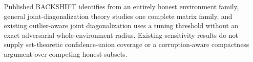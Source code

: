 Published BACKSHIFT identifies from an entirely honest environment family, general joint-diagonalization theory studies one complete matrix family, and existing outlier-aware joint diagonalization uses a tuning threshold without an exact adversarial whole-environment radius. Existing sensitivity results do not supply set-theoretic confidence-union coverage or a corruption-aware compactness argument over competing honest subsets.
